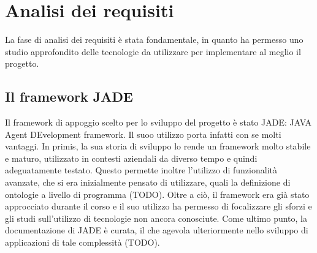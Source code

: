 \section{Analisi dei requisiti}



La fase di analisi dei requisiti è stata fondamentale, in quanto ha permesso uno studio approfondito delle tecnologie da utilizzare per implementare al meglio il progetto.

\subsection{Il framework JADE}
Il framework di appoggio scelto per lo sviluppo del progetto è stato JADE: JAVA Agent DEvelopment framework. Il suoo utilizzo porta infatti con se molti vantaggi. In primis, la sua storia di sviluppo lo rende un framework molto stabile e maturo, utilizzato in contesti aziendali da diverso tempo e quindi adeguatamente testato. Questo permette inoltre l'utilizzo di funzionalità avanzate, che si era inizialmente pensato di utilizzare, quali la definizione di ontologie a livello di programma (TODO). Oltre a ciò, il framework era già stato approcciato durante il corso e il suo utilizzo ha permesso di focalizzare gli sforzi e gli studi sull'utilizzo di tecnologie non ancora conosciute.
Come ultimo punto, la documentazione di JADE è curata, il che agevola ulteriormente nello sviluppo di applicazioni di tale complessità (TODO).
